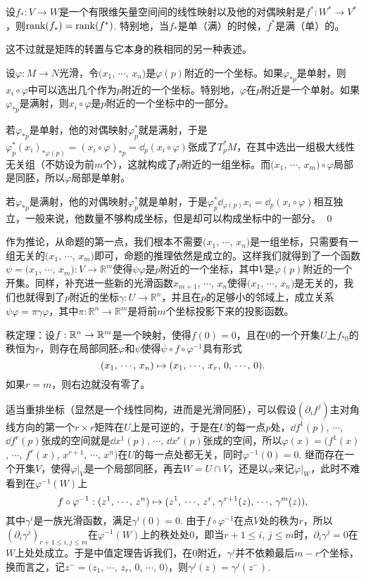 \lem 设$f_*:V\to W$是一个有限维矢量空间间的线性映射以及他的对偶映射是$f^*:W^*\to V^*$，则$\operatorname{rank}(f_*)=\operatorname{rank}(f^*)$. 特别地，当$f_*$是单（满）的时候，$f^*$是满（单）的。

这不过就是矩阵的转置与它本身的秩相同的另一种表述。

\pro \label{pro:111}设$\varphi:M\to N$光滑，令$(x_1$, $\cdots$, $x_n)$是$\varphi(p)$附近的一个坐标。如果$\varphi_{*p}$是单射，则$x_i\circ\varphi$中可以选出几个作为$p$附近的一个坐标。特别地，$\varphi$在$p$附近是一个单射。如果$\varphi_{*p}$是满射，则$x_i\circ\varphi$是$p$附近的一个坐标中的一部分。

\proof
	若$\varphi_{*p}$是单射，他的对偶映射$\varphi^*_p$就是满射，于是$\varphi^*_p(x_i)_{*\varphi(p)}=(x_i\circ\varphi)_{*p}=\dd_p(x_i\circ \varphi)$张成了$T_p^*M$，在其中选出一组极大线性无关组（不妨设为前$m$个），这就构成了$p$附近的一组坐标。而$(x_1$, $\cdots$, $x_m)\circ \varphi$局部是同胚，所以$\varphi$局部是单射。

	若$\varphi_{*p}$是满射，他的对偶映射$\varphi^*_p$就是单射，于是$\varphi^*_p\dd_{\varphi(p)}x_i=\dd_p(x_i\circ \varphi)$相互独立，一般来说，他数量不够构成坐标，但是却可以构成坐标中的一部分。
\qed

作为推论，从命题的第一点，我们根本不需要$(x_1$, $\cdots$, $x_n)$是一组坐标，只需要有一组无关的$(x_1$, $\cdots$, $x_m)$即可，命题的推理依然是成立的。这样我们就得到了一个函数$\psi=(x_1$, $\cdots$, $x_m):V\to \mathbb{R}^m$使得$\psi\varphi$是$p$附近的一个坐标，其中$V$是$\varphi(p)$附近的一个开集。同样，补充进一些新的光滑函数$x_{m+1}$, $\cdots$, $x_n$使得$(x_1$, $\cdots$, $x_n)$是无关的，我们也就得到了$p$附近的坐标$\gamma:U\to \mathbb{R}^n$，并且在$p$的足够小的邻域上，成立关系$\psi\varphi=\pi\gamma\varphi$，其中$\pi:\mathbb{R}^n\to\mathbb{R}^m$是将前$m$个坐标投影下来的投影函数。

\theo 秩定理：设$f:\mathbb{R}^n\to\mathbb{R}^m$是一个映射，使得$f(0)=0$，且在$0$的一个开集$U$上$f_{*0}$的秩恒为$r$，则存在局部同胚$\varphi$和$\psi$使得$\psi\circ f\circ \varphi^{-1}$具有形式
\[
	(x_1 ,\,\cdots\hspace{-0.05em},\,  x_n)\mapsto (x_1 ,\,\cdots\hspace{-0.05em},\, x_r,\,0 ,\,\cdots\hspace{-0.05em},\, 0).
\]
如果$r=m$，则右边就没有零了。

\proof
	适当重排坐标（显然是一个线性同构，进而是光滑同胚），可以假设$(\partial_i f^j)$主对角线方向的第一个$r\times r$矩阵在$U$上是可逆的，于是在$U$的每一点$p$处，$\dd f^1(p)$, $\cdots$, $\dd f^r(p)$张成的空间就是$\dd x^1(p)$, $\cdots$, $\dd x^r(p)$张成的空间，所以$\varphi(x)=(f^1(x)$, $\cdots$, $f^r(x)$, $x^{r+1}$, $\cdots$, $x^n)$在$U$的每一点处都无关，同时$\varphi^{-1}(0)=0$. 继而存在一个开集$V$，使得$\varphi|_V$是一个局部同胚，再去$W=U\cap V$，还是以$\varphi$来记$\varphi|_{W}$，此时不难看到在$\varphi^{-1}(W)$上
	\[
	f\circ \varphi^{-1}:(z^1 ,\,\cdots\hspace{-0.05em},\, z^n)\mapsto (z^1 ,\,\cdots\hspace{-0.05em},\, z^r,\, \gamma^{r+1}(z) ,\,\cdots\hspace{-0.05em},\, \gamma^m(z)),
	\]
	其中$\gamma^i$是一族光滑函数，满足$\gamma^i(0)=0$. 由于$f\circ \varphi^{-1}$在点$V$处的秩为$r$，所以$(\partial_{i}\gamma^j)_{r+1\leq i,j\leq m}$在$\varphi^{-1}(W)$上的秩处处$0$，即当$r+1\leq i$, $j\leq m$时，$\partial_{i}\gamma^j=0$在$W$上处处成立。于是中值定理告诉我们，在$0$附近，$\gamma^j$并不依赖最后$m-r$个坐标，换而言之，记$z^-=(z_1$, $\cdots$, $z_r$, $0$, $\cdots$, $0)$，则$\gamma^j(z)=\gamma^j(z^-)$.

